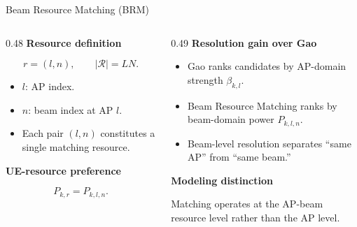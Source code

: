 \documentclass[10pt,aspectratio=169]{beamer}
\begin{document}
\begin{frame}{Beam Resource Matching (BRM)}
    \small
    \begin{columns}[T,onlytextwidth]
        \begin{column}{0.48\textwidth}
            \textbf{\large Resource definition}
            
            \vspace{0.75em}
            \[
                r=(l,n),
                \qquad
                |\mathcal{R}|=LN.
            \]
            
            \vspace{0.7em}
            {
                \begin{itemize}
                    \setlength{\itemsep}{0.45em}
                    \item \(l\): AP index.
                    \item \(n\): beam index at AP \(l\).
                    \item Each pair \((l,n)\) constitutes a single matching resource.
                \end{itemize}}
            
            \vspace{1.0em}
            \textbf{\large UE-resource preference}
            
            \vspace{0.45em}
            \[
                P_{k,r}=P_{k,l,n}.
            \]
        \end{column}
        \begin{column}{0.49\textwidth}
            \textbf{\large Resolution gain over Gao}
            
            \vspace{0.65em}
            {
                \begin{itemize}
                    \setlength{\itemsep}{0.45em}
                    \item Gao ranks candidates by AP-domain strength \(\beta_{k,l}\).
                    \item Beam Resource Matching ranks by beam-domain power \(P_{k,l,n}\).
                    \item Beam-level resolution separates ``same AP'' from ``same beam.''
                \end{itemize}}
            
            \vspace{1.0em}
            \textbf{\large Modeling distinction}
            
            \vspace{0.55em}
            Matching operates at the AP-beam resource level rather than the AP level.
        \end{column}
    \end{columns}
\end{frame}
\end{document}
